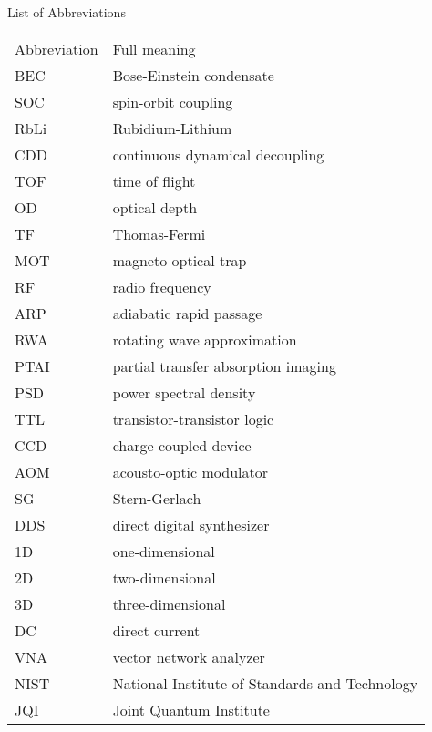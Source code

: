 
\renewcommand{\baselinestretch}{1}
\small\normalsize
\hbox{\ }

\vspace{-3em}


\begin{center}
\large{List of Abbreviations}
\end{center} 

\vspace{3pt}

\begin{tabular}{ll}
Abbreviation & Full meaning \\
BEC & Bose-Einstein condensate \\
SOC & spin-orbit coupling \\
RbLi & Rubidium-Lithium \\
CDD & continuous dynamical decoupling \\
TOF & time of flight \\
OD & optical depth \\
TF & Thomas-Fermi \\
MOT & magneto optical trap \\
RF & radio frequency \\
ARP & adiabatic rapid passage \\
RWA & rotating wave approximation \\
PTAI & partial transfer absorption imaging \\
PSD & power spectral density \\
TTL & transistor-transistor logic \\
CCD & charge-coupled device \\
AOM & acousto-optic modulator \\
SG & Stern-Gerlach \\
DDS & direct digital synthesizer \\
1D & one-dimensional \\
2D & two-dimensional \\
3D & three-dimensional \\
DC & direct current \\
VNA & vector network analyzer \\

NIST & National Institute of Standards and Technology \\
JQI & Joint Quantum Institute
\end{tabular}
